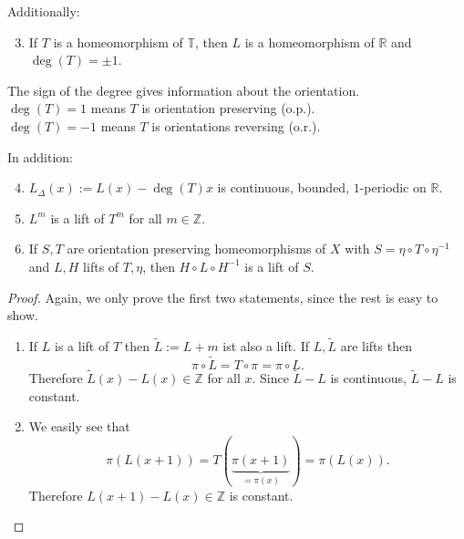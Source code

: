 \documentclass{article}
\newcommand*{\Z}{\mathbb{Z}}
\newcommand*{\R}{\mathbb{R}}
\newcommand*{\T}{\mathbb{T}}
\begin{document}
\begin{prop}
    Additionally:
    \begin{enumerate}
        \setcounter{enumi}{2}
        \item If $T$ is a homeomorphism of $\T$, then $L$ is a homeomorphism of $\R$ and $\deg(T)=\pm1$.
    \end{enumerate}
\end{prop}

\begin{rem}
    The sign of the degree gives information about the orientation.\\
    $\deg(T)=1$ means $T$ is orientation preserving (o.p.).\\
    $\deg(T)=-1$ means $T$ is orientations reversing (o.r.).
\end{rem}

\begin{prop}
    In addition:
    \begin{enumerate}
        \setcounter{enumi}{3}
        \item $L_\Delta(x) := L(x)-\deg(T)x$ is continuous, bounded, $1$-periodic on $\R$.

        \item $L^m$ is a lift of $T^m$ for all $m\in\Z$.

        \item If $S,T$ are orientation preserving homeomorphisms of $X$ with $S=\eta\circ T\circ \eta^{-1}$ and $L,H$ lifts of $T,\eta$, then $H\circ L\circ H^{-1}$ is a lift of $S$.
    \end{enumerate}
\end{prop}

\begin{proof}
    Again, we only prove the first two statements, since the rest is easy to show.
    \begin{enumerate}
        \item If $L$ is a lift of $T$ then $\tilde L:=L+m$ ist also a lift. If $L,\tilde L$ are lifts then
        $$\pi\circ \tilde L = T\circ \pi=\pi\circ L.$$ Therefore $\tilde L(x)-L(x)\in\Z$ for all $x$. Since $\tilde L-L$ is continuous, $\tilde L-L$ is constant.

        \item We easily see that
        $$\pi(L(x+1))=T(\underbrace{\pi(x+1)}_{=\pi(x)})=\pi(L(x)).$$ Therefore $L(x+1)-L(x)\in\Z$ is constant.
    \end{enumerate}
\end{proof}
\end{document}
